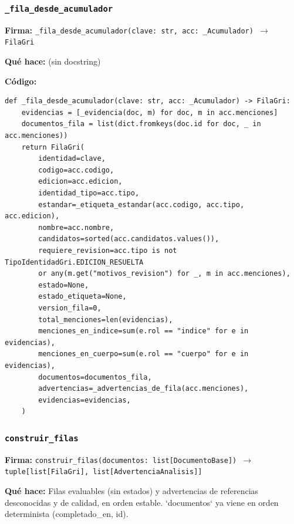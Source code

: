 \documentclass[11pt,a4paper]{article}
\begin{document}
\subsubsection*{\texttt{\_fila\_desde\_acumulador}}
\textbf{Firma:} \texttt{\_fila\_desde\_acumulador(clave: str, acc: \_Acumulador) $\rightarrow$ FilaGri}

\textbf{Qué hace:} (sin docstring)

\textbf{Código:}
\begin{lstlisting}
def _fila_desde_acumulador(clave: str, acc: _Acumulador) -> FilaGri:
    evidencias = [_evidencia(doc, m) for doc, m in acc.menciones]
    documentos_fila = list(dict.fromkeys(doc.id for doc, _ in acc.menciones))
    return FilaGri(
        identidad=clave,
        codigo=acc.codigo,
        edicion=acc.edicion,
        identidad_tipo=acc.tipo,
        estandar=_etiqueta_estandar(acc.codigo, acc.tipo, acc.edicion),
        nombre=acc.nombre,
        candidatos=sorted(acc.candidatos.values()),
        requiere_revision=acc.tipo is not TipoIdentidadGri.EDICION_RESUELTA
        or any(m.get("motivos_revision") for _, m in acc.menciones),
        estado=None,
        estado_etiqueta=None,
        version_fila=0,
        total_menciones=len(evidencias),
        menciones_en_indice=sum(e.rol == "indice" for e in evidencias),
        menciones_en_cuerpo=sum(e.rol == "cuerpo" for e in evidencias),
        documentos=documentos_fila,
        advertencias=_advertencias_de_fila(acc.menciones),
        evidencias=evidencias,
    )
\end{lstlisting}

\subsubsection*{\texttt{construir\_filas}}
\textbf{Firma:} \texttt{construir\_filas(documentos: list[DocumentoBase]) $\rightarrow$ tuple[list[FilaGri], list[AdvertenciaAnalisis]]}

\textbf{Qué hace:} Filas evaluables (sin estados) y advertencias de referencias desconocidas y de calidad, en orden estable.
`documentos` ya viene en orden determinista (completado\_en, id).
\end{document}
